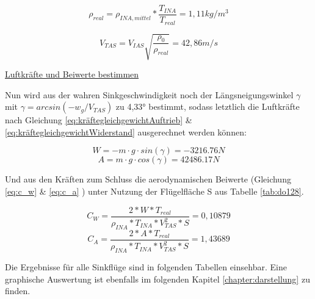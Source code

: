 \vspace{5mm}

\begin{equation*}
\rho_{real} = \rho_{INA,mittel} * \frac{T_{INA}}{T_{real}} = 1,11 kg/m^3
\end{equation*}

\vspace{5mm}

\begin{equation*}
V_{TAS} = V_{IAS}\sqrt{\frac{\rho_0}{\rho_{real}}} =42,86 m/s
\end{equation*}


\vspace{5mm} \noindent
\underline{Luftkräfte und Beiwerte bestimmen}

\noindent Nun wird aus der wahren Sinkgeschwindigkeit noch der Längsneigungswinkel $\gamma$ mit $\gamma = arcsin(-w_g/V_{TAS})$ zu 4,33° bestimmt, sodass letztlich die Luftkräfte nach Gleichung \ref{eq:kräftegleichgewichtAuftrieb} \& \ref{eq:kräftegleichgewichtWiderstand} ausgerechnet werden können:

\begin{equation*}
W = - m\cdot g \cdot sin(\gamma) = -3216.76 N
\end{equation*}
\begin{equation*}
A = m\cdot g \cdot cos(\gamma) = 42486.17 N
\end{equation*}

\vspace{5mm} \noindent
Und aus den Kräften zum Schluss die aerodynamischen Beiwerte (Gleichung \ref{eq:c_w} \& \ref{eq:c_a} ) unter Nutzung der Flügelfläche S aus Tabelle \ref{tab:do128}.

\begin{equation*}
C_W = \frac{2*W*T_{real}}{\rho_{INA} * T_{INA} * V_{TAS}^2 * S} = 0,10879
\end{equation*}
\begin{equation*}
C_A = \frac{2*A*T_{real}}{\rho_{INA} * T_{INA} * V_{TAS}^2 * S} = 1,43689
\end{equation*}

\vspace{5mm} \noindent
Die Ergebnisse für alle Sinkflüge sind in folgenden Tabellen einsehbar. Eine graphische Auswertung ist ebenfalls im folgenden Kapitel \ref{chapter:darstellung} zu finden.\\

